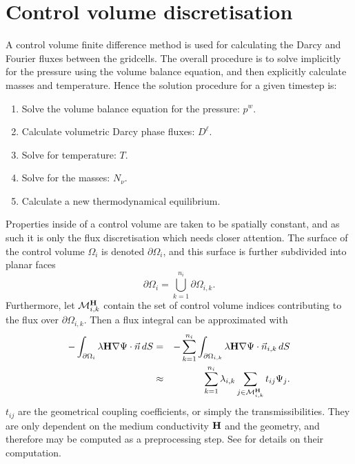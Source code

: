 \chapter{Control volume discretisation}

\minitoc

A control volume finite difference method is used for calculating the
Darcy and Fourier fluxes between the gridcells. The overall procedure
is to solve implicitly for the pressure using the volume balance
equation, and then explicitly calculate masses and temperature. Hence
the solution procedure for a given timestep is:
\begin{enumerate}
\item Solve the volume balance equation for the pressure: $p^w$.
\item Calculate volumetric Darcy phase fluxes: $D^\ell$.
\item Solve for temperature: $T$.
\item Solve for the masses: $N_\nu$.
\item Calculate a new thermodynamical equilibrium.
\end{enumerate}



Properties inside of a control volume are taken to be spatially
constant, and as such it is only the flux discretisation which needs
closer attention. The surface of the control volume $\Omega_i$ is
denoted $\partial\Omega_i$, and this surface is further subdivided
into planar faces
\begin{equation}
  \partial\Omega_i = \bigcup_{k=1}^{n_i} \partial\Omega_{i,k}.
\end{equation}
Furthermore, let $\mathcal{M}_{i,k}^{\textbf H}$ contain the set of
control volume indices contributing to the flux over
$\partial\Omega_{i,k}$. Then a flux integral can be approximated with
\begin{eqnarray}
  -\int_{\partial\Omega_i} \lambda{\textbf H}\nabla\Psi\cdot\vec n\, dS
  & = & -\sum_{k=1}^{n_i} \int_{\partial\Omega_{i,k}}
  \lambda{\textbf H}\nabla\Psi\cdot\vec n_{i,k}\, dS \\
  & \approx & \sum_{k=1}^{n_i} \lambda_{i,k}
  \sum_{j\in\mathcal{M}_{i,k}^{\textbf H}} t_{ij} \Psi_j.
\end{eqnarray}
$t_{ij}$ are the geometrical coupling coefficients, or simply the
transmissibilities. They are only dependent on the medium conductivity
${\textbf H}$ and the geometry, and therefore may be computed as a
preprocessing step. See \cite{aavatsmarkell} for details on their
computation.

